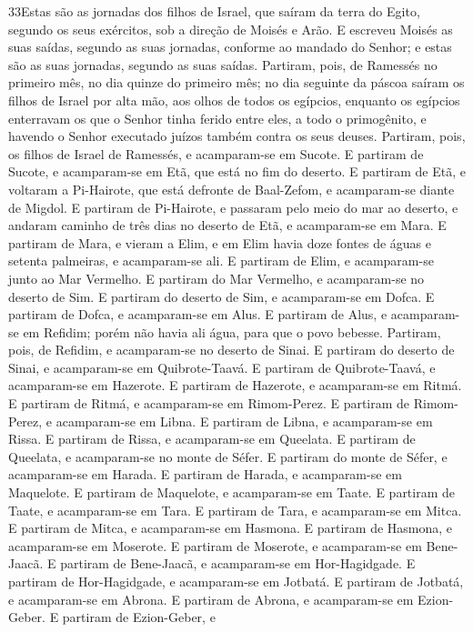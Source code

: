 \medskip

\lettrine{33} Estas são as jornadas dos filhos de Israel, que
saíram da terra do Egito, segundo os seus exércitos, sob a direção
de Moisés e Arão. E escreveu Moisés as suas saídas, segundo as
suas jornadas, conforme ao mandado do Senhor; e estas são as suas
jornadas, segundo as suas saídas. Partiram, pois, de Ramessés no
primeiro mês, no dia quinze do primeiro mês; no dia seguinte da
páscoa saíram os filhos de Israel por alta mão, aos olhos de todos
os egípcios, enquanto os egípcios enterravam os que o Senhor
tinha ferido entre eles, a todo o primogênito, e havendo o Senhor
executado juízos também contra os seus deuses. Partiram, pois,
os filhos de Israel de Ramessés, e acamparam-se em Sucote. E
partiram de Sucote, e acamparam-se em Etã, que está no fim do
deserto. E partiram de Etã, e voltaram a Pi-Hairote, que está
defronte de Baal-Zefom, e acamparam-se diante de Migdol. E
partiram de Pi-Hairote, e passaram pelo meio do mar ao deserto, e
andaram caminho de três dias no deserto de Etã, e acamparam-se em
Mara. E partiram de Mara, e vieram a Elim, e em Elim havia doze
fontes de águas e setenta palmeiras, e acamparam-se ali. E
partiram de Elim, e acamparam-se junto ao Mar Vermelho. E
partiram do Mar Vermelho, e acamparam-se no deserto de Sim. E
partiram do deserto de Sim, e acamparam-se em Dofca. E
partiram de Dofca, e acamparam-se em Alus. E partiram de
Alus, e acamparam-se em Refidim; porém não havia ali água, para que
o povo bebesse. Partiram, pois, de Refidim, e acamparam-se no
deserto de Sinai. E partiram do deserto de Sinai, e
acamparam-se em Quibrote-Taavá. E partiram de Quibrote-Taavá,
e acamparam-se em Hazerote. E partiram de Hazerote, e
acamparam-se em Ritmá. E partiram de Ritmá, e acamparam-se em
Rimom-Perez. E partiram de Rimom-Perez, e acamparam-se em
Libna. E partiram de Libna, e acamparam-se em Rissa. E
partiram de Rissa, e acamparam-se em Queelata. E partiram de
Queelata, e acamparam-se no monte de Séfer. E partiram do
monte de Séfer, e acamparam-se em Harada. E partiram de
Harada, e acamparam-se em Maquelote. E partiram de Maquelote,
e acamparam-se em Taate. E partiram de Taate, e acamparam-se
em Tara. E partiram de Tara, e acamparam-se em Mitca.
E partiram de Mitca, e acamparam-se em Hasmona. E
partiram de Hasmona, e acamparam-se em Moserote. E partiram
de Moserote, e acamparam-se em Bene-Jaacã. E partiram de
Bene-Jaacã, e acamparam-se em Hor-Hagidgade. E partiram de
Hor-Hagidgade, e acamparam-se em Jotbatá. E partiram de
Jotbatá, e acamparam-se em Abrona. E partiram de Abrona, e
acamparam-se em Ezion-Geber. E partiram de Ezion-Geber, e
